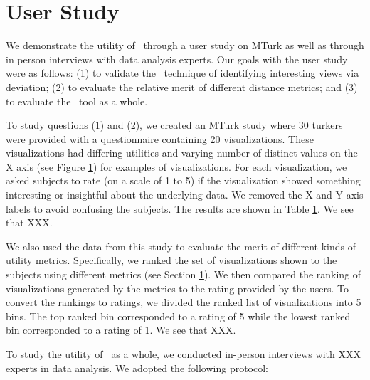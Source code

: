 
\section{User Study}

We demonstrate the utility of \SeeDB\ through a user study on MTurk as well as
through in person interviews with data analysis experts. 
Our goals with the user study were as follows: (1) to validate the \SeeDB\
technique of identifying interesting views via deviation; (2) to evaluate the
relative merit of different distance metrics; and (3) to evaluate the \SeeDB\
tool as a whole.

To study questions (1) and (2), we created an MTurk study where 30 turkers were
provided with a questionnaire containing 20 visualizations. These visualizations
had differing utilities and varying number of distinct values on the X axis
(see Figure \ref{}) for examples of visualizations. For each visualization, we
asked subjects to rate (on a scale of 1 to 5) if the visualization showed
something interesting or insightful about the underlying data. We removed the X
and Y axis labels to avoid confusing the subjects. The results are shown in
Table \ref{}. We see that XXX. 

We also used the data from this study to evaluate the
merit of different kinds of utility metrics. Specifically, we ranked the set of
visualizations shown to the subjects using different metrics (see Section
\ref{}).
We then compared the ranking of visualizations generated by the metrics to the
rating provided by the users. 
To convert the rankings to ratings, we divided the ranked list of visualizations
into 5 bins. The top ranked bin corresponded to a rating of 5 while the lowest
ranked bin corresponded to a rating of 1.
We see that XXX.

To study the utility of \SeeDB\ as a whole, we conducted in-person interviews
with XXX experts in data analysis. We adopted the following protocol: 


